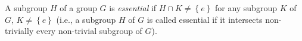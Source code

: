 \documentclass[12pt]{article}
\begin{document}
A subgroup $H$ of a group $G$ is \textit{essential} if $H\cap K\neq\left\{ e\right\} $ for any subgroup $K$ of $G$, $K\neq\left\{ e\right\} $ (i.e., a subgroup $H$ of $G$ is called essential if it intersects non-trivially every
non-trivial subgroup of $G$).
\end{document}
